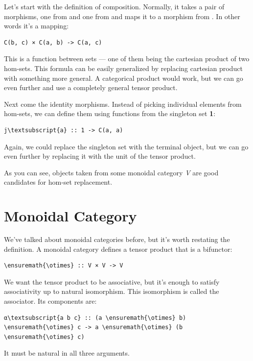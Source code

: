 Let's start with the definition of composition. Normally, it takes a
pair of morphisms, one from  and one from
 and maps it to a morphism from . In
other words it's a mapping:

\begin{Verbatim}[commandchars=\\\{\}]
C(b, c) × C(a, b) -> C(a, c)
\end{Verbatim}
This is a function between sets --- one of them being the cartesian
product of two hom-sets. This formula can be easily generalized by
replacing cartesian product with something more general. A categorical
product would work, but we can go even further and use a completely
general tensor product.

Next come the identity morphisms. Instead of picking individual elements
from hom-sets, we can define them using functions from the singleton set
\textbf{1}:

\begin{Verbatim}[commandchars=\\\{\}]
j\textsubscript{a} :: 1 -> C(a, a)
\end{Verbatim}
Again, we could replace the singleton set with the terminal object, but
we can go even further by replacing it with the unit  of the
tensor product.

As you can see, objects taken from some monoidal category \emph{V} are
good candidates for hom-set replacement.

\section{Monoidal Category}\label{monoidal-category}

We've talked about monoidal categories before, but it's worth restating
the definition. A monoidal category defines a tensor product that is a
bifunctor:

\begin{Verbatim}[commandchars=\\\{\}]
\ensuremath{\otimes} :: V × V -> V
\end{Verbatim}
We want the tensor product to be associative, but it's enough to satisfy
associativity up to natural isomorphism. This isomorphism is called the
associator. Its components are:

\begin{Verbatim}[commandchars=\\\{\}]
α\textsubscript{a b c} :: (a \ensuremath{\otimes} b) \ensuremath{\otimes} c -> a \ensuremath{\otimes} (b \ensuremath{\otimes} c)
\end{Verbatim}
It must be natural in all three arguments.

